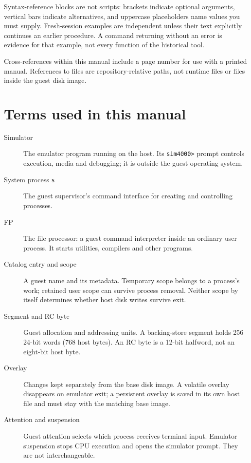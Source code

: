 Syntax-reference blocks are not scripts: brackets indicate optional arguments,
vertical bars indicate alternatives, and uppercase placeholders name values
you must supply. Fresh-session examples are independent unless their text
explicitly continues an earlier procedure. A command returning without an
error is evidence for that example, not every function of the historical tool.

Cross-references within this manual include a page number for use with a printed
manual. References to  files are repository-relative paths, not
runtime files or files inside the guest disk image.

\section*{Terms used in this manual}
\begin{description}
\item[Simulator] The emulator program running on the host. Its \texttt{sim4000>} prompt controls
execution, media and debugging; it is outside the guest operating system.
\item[System process \texttt{s}] The guest supervisor's command interface for
creating and controlling processes.
\item[FP] The file processor: a guest command interpreter inside an ordinary
user process. It starts utilities, compilers and other programs.
\item[Catalog entry and scope] A guest name and its metadata. Temporary scope
belongs to a process's work; retained user scope can survive process removal.
Neither scope by itself determines whether host disk writes survive exit.
\item[Segment and RC byte] Guest allocation and addressing units.
A backing-store segment holds 256 24-bit words (768 host bytes).
An RC byte is a 12-bit halfword, not an eight-bit host byte.
\item[Overlay] Changes kept separately from the base disk image.
A volatile overlay disappears on emulator exit; a persistent overlay is
saved in its own host file and must stay with the matching base image.
\item[Attention and suspension] Guest attention selects which process receives
terminal input. Emulator suspension stops CPU execution and opens the
simulator prompt. They are not interchangeable.
\end{description}

